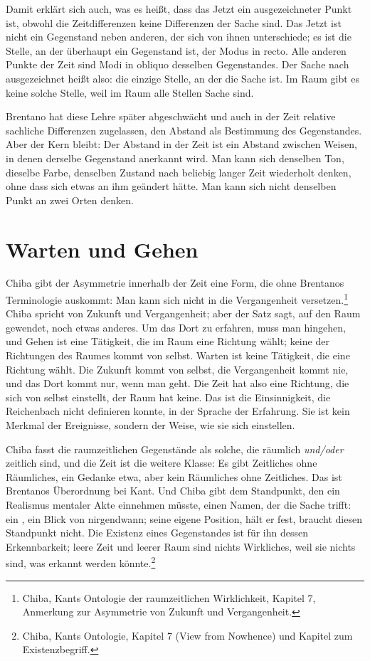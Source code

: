 Damit erklärt sich auch, was es heißt, dass das Jetzt  ein ausgezeichneter Punkt ist, obwohl die Zeitdifferenzen keine Differenzen der Sache sind. Das Jetzt ist nicht ein Gegenstand neben anderen, der sich von ihnen unterschiede; es ist die Stelle, an der überhaupt ein Gegenstand ist, der Modus in recto. Alle anderen Punkte der Zeit sind Modi in obliquo desselben Gegenstandes. Der Sache nach ausgezeichnet heißt also: die einzige Stelle, an der die Sache ist. Im Raum gibt es keine solche Stelle, weil im Raum alle Stellen Sache sind.

Brentano hat diese Lehre später abgeschwächt und auch in der Zeit relative sachliche Differenzen zugelassen, den Abstand als Bestimmung des Gegenstandes. Aber der Kern bleibt: Der Abstand in der Zeit ist ein Abstand zwischen Weisen, in denen derselbe Gegenstand anerkannt wird. Man kann sich denselben Ton, dieselbe Farbe, denselben Zustand nach beliebig langer Zeit wiederholt denken, ohne dass sich etwas an ihm geändert hätte. Man kann sich nicht denselben Punkt an zwei Orten denken.

\section{Warten und Gehen}

Chiba gibt der Asymmetrie innerhalb der Zeit eine Form, die ohne Brentanos Terminologie auskommt:  Man kann sich nicht in die Vergangenheit versetzen.\footnote{Chiba, Kants Ontologie der raumzeitlichen Wirklichkeit, Kapitel 7, Anmerkung zur Asymmetrie von Zukunft und Vergangenheit.} Chiba spricht von Zukunft und Vergangenheit; aber der Satz sagt, auf den Raum gewendet, noch etwas anderes. Um das Dort zu erfahren, muss man hingehen, und Gehen ist eine Tätigkeit, die im Raum eine Richtung wählt; keine der Richtungen des Raumes kommt von selbst. Warten ist keine Tätigkeit, die eine Richtung wählt. Die Zukunft kommt von selbst, die Vergangenheit kommt nie, und das Dort kommt nur, wenn man geht. Die Zeit hat also eine Richtung, die sich von selbst einstellt, der Raum hat keine. Das ist die Einsinnigkeit, die Reichenbach nicht definieren konnte, in der Sprache der Erfahrung. Sie ist kein Merkmal der Ereignisse, sondern der Weise, wie sie sich einstellen.

Chiba fasst die raumzeitlichen Gegenstände als solche, die räumlich \emph{und/oder} zeitlich sind, und die Zeit ist die weitere Klasse: Es gibt Zeitliches ohne Räumliches, ein Gedanke etwa, aber kein Räumliches ohne Zeitliches. Das ist Brentanos Überordnung bei Kant. Und Chiba gibt dem Standpunkt, den ein Realismus mentaler Akte einnehmen müsste, einen Namen, der die Sache trifft: ein , ein Blick von nirgendwann; seine eigene Position, hält er fest, braucht diesen Standpunkt nicht. Die Existenz eines Gegenstandes ist für ihn dessen Erkennbarkeit; leere Zeit und leerer Raum sind nichts Wirkliches, weil sie nichts sind, was erkannt werden könnte.\footnote{Chiba, Kants Ontologie, Kapitel 7 (View from Nowhence) und Kapitel zum Existenzbegriff.}

